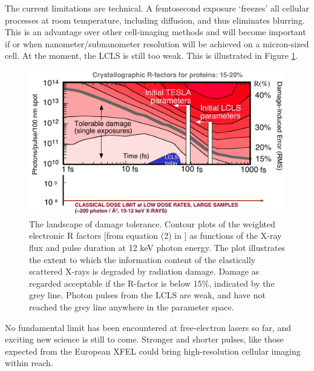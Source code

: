 The current limitations are technical. A femtosecond exposure ‘freezes’ all cellular processes at room temperature, including diffusion, and thus eliminates blurring. This is an advantage over other cell-imaging methods and will become important if or when nanometer/subnanometer resolution will be achieved on a micron-sized cell. At the moment, the LCLS is still too weak. This is illustrated in Figure \ref{fig:landscape}.


\begin{figure}[!h]
\centering
\includegraphics[width=120mm]{Chapter_10_Discussion_LandscapeDamageTolerance.png}
\caption{The landscape of damage tolerance. Contour plots of the weighted electronic R factors [from equation (2) in \cite{Neutze2000}] as functions of the X-ray  flux and pulse duration at 12 keV photon energy. The plot illustrates the extent to which the information content of the elastically scattered X-rays is degraded by radiation damage. Damage as regarded acceptable if the R-factor is below 15\%,  indicated by the grey line. Photon pulses from the LCLS are weak, and have not reached the grey line anywhere in the parameter space.}\label{fig:landscape}
\end{figure}

No fundamental limit has been encountered at free-electron lasers so far, and exciting new science is still to come. Stronger and shorter pulses, like those expected from the European XFEL could bring high-resolution cellular imaging within reach. 
